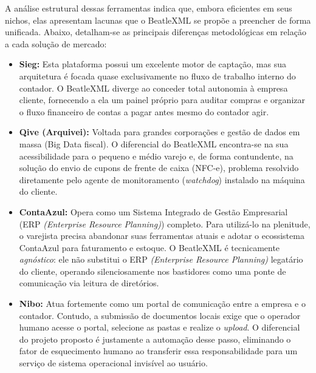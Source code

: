 \documentclass[12pt]{article}
\begin{document}
A análise estrutural dessas ferramentas indica que, embora eficientes em seus nichos, elas apresentam lacunas que o BeatleXML se propõe a preencher de forma unificada. Abaixo, detalham-se as principais diferenças metodológicas em relação a cada solução de mercado:

\begin{itemize}
    \item \textbf{Sieg:} Esta plataforma possui um excelente motor de captação, mas sua arquitetura é focada quase exclusivamente no fluxo de trabalho interno do contador. O BeatleXML diverge ao conceder total autonomia à empresa cliente, fornecendo a ela um painel próprio para auditar compras e organizar o fluxo financeiro de contas a pagar antes mesmo do contador agir.
    
    \item \textbf{Qive (Arquivei):} Voltada para grandes corporações e gestão de dados em massa (Big Data fiscal). O diferencial do BeatleXML encontra-se na sua acessibilidade para o pequeno e médio varejo e, de forma contundente, na solução do envio de cupons de frente de caixa (NFC-e), problema resolvido diretamente pelo agente de monitoramento (\textit{watchdog}) instalado na máquina do cliente.
    
    \item \textbf{ContaAzul:} Opera como um Sistema Integrado de Gestão Empresarial (ERP \textit{(Enterprise Resource Planning)}) completo. Para utilizá-lo na plenitude, o varejista precisa abandonar suas ferramentas atuais e adotar o ecossistema ContaAzul para faturamento e estoque. O BeatleXML é tecnicamente \textit{agnóstico}: ele não substitui o ERP \textit{(Enterprise Resource Planning)} legatário do cliente, operando silenciosamente nos bastidores como uma ponte de comunicação via leitura de diretórios.
    
    \item \textbf{Nibo:} Atua fortemente como um portal de comunicação entre a empresa e o contador. Contudo, a submissão de documentos locais exige que o operador humano acesse o portal, selecione as pastas e realize o \textit{upload}. O diferencial do projeto proposto é justamente a automação desse passo, eliminando o fator de esquecimento humano ao transferir essa responsabilidade para um serviço de sistema operacional invisível ao usuário.
\end{itemize}

\end{document}
